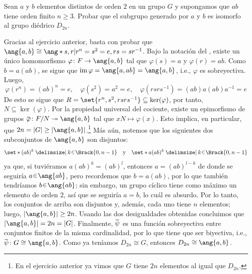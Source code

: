 \begin{ejer}
Sean $a$ y $b$ elementos distintos de orden $2$ en un grupo $G$ y supongamos que $ab$ tiene orden finito $n \ge 3$. Probar que el subgrupo generado por $a$ y $b$ es isomorfo al grupo diédrico $D_{2n}$.
\end{ejer}
\begin{sol}[Demostración]
Gracias al ejercicio anterior, basta con probar que $\ang{a,b} \cong \ang*{ s,r|r^{n}=s^{2}=e,rs=sr^{-1}}$. Bajo la notación del , existe un único homomorfismo $\varphi \colon F \to \ang{a,b}$ tal que $\varphi(s) = a$ y $\varphi(r) = ab$. Como $b = a(ab)$, se sigue que $\im \varphi = \ang{a,ab} = \ang{a,b}$, i.e., $\varphi$ es sobreyectiva. Luego,
\[
\varphi(r^n) = (ab)^n = e, \quad \varphi(s^2)=a^2 = e, \quad\varphi(rsrs^{-1}) = (ab)a(ab)a^{-1} = e
\]
De esto se sigue que $R = \set{r^n,s^2,rsrs^{-1}} \subseteq \ker(\varphi)$, por tanto, $N \subseteq \ker(\varphi)$. Por la propiedad universal del cociente, existe un epimorfismo de grupos $\ubar{\varphi} \colon F/N \twoheadrightarrow \ang{a,b}$ tal que $xN \mapsto \varphi(x)$. Esto implica, en particular, que $2n = |G| \geq |\ang{a,b}|$.\footnote{En el ejercicio anterior ya vimos que $G$ tiene $2n$ elementos al igual que $D_{2n}$.} Más aún, notemos que los siguientes dos subconjuntos de $\ang{a,b}$ son disjuntos:
\[
\set*{(ab)^k \given k \en \Brack{0, n-1}}%
\quad\text{y}\quad%
\set*{a(ab)^k \given k \en \Brack{0, n-1}}
\]
ya que, si tuviéramos $a(ab)^k = (ab)^l$, entonces $a = (ab)^{l-k}$ de donde se seguiría $a \en \ang{ab}$, pero recordemos que $b = a(ab)$, por lo que también tendríamos $b \en \ang{ab}$; sin embargo, un grupo cíclico tiene como máximo un elemento de orden $2$, así que se seguiría $a=b$, lo cuál es absurdo. Por lo tanto, los conjuntos de arriba son disjuntos y, además, cada uno tiene $n$ elementos; luego, $|\ang{a,b}| \geq 2n$. Usando las dos desigualdades obtenidas concluimos que $|\ang{a,b}| = 2n = |G|$. Finalmente, $\ubar{\psi}$ es una función sobreyectiva entre conjuntos finitos de la misma cardinalidad, por lo que tiene que ser biyectiva, i.e., $\ubar{\psi} \colon G \cong \ang{a,b}$. Como ya teníamos $D_{2n} \cong G$, entonces $D_{2n} \cong \ang{a,b}$.
\end{sol}\clearpage

